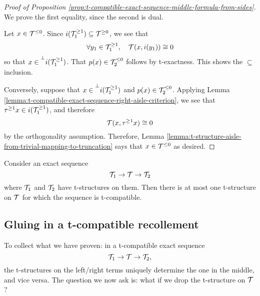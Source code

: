 \begin{proof}[Proof of Proposition \ref{prop:t-compatible-exact-sequence-middle-formula-from-sides}]
We prove the first equality, since the second is dual.

Let \(x\in\mathcal{T}^{\leq 0}\). Since \(i(\mathcal{T}_1^{\geq 1})\subseteq\mathcal{T}^{\geq 0}\), we see that
\[ \forall y_1\in\mathcal{T}_1^{\geq 1},\quad \mathcal{T}(x,i(y_1)) \cong 0 \]
so that \(x\in\prescript{\perp}{}{i(\ensuremath{\mathcal{T}}_1^{\geq 1})}\). That \(p(x)\in\mathcal{T}_2^{\leq 0}\) follows by t-exactness. This shows the \(\subseteq\) inclusion.

Conversely, suppose that \(x\in\prescript{\perp}{}{i(\ensuremath{\mathcal{T}}_1^{\geq 1})}\) and \(p(x)\in\mathcal{T}_2^{\leq 0}\). Applying Lemma \ref{lemma:t-compatible-exact-sequence-right-aisle-criterion}, we see that
\(\tau^{\geq 1}x \in i(\mathcal{T}_1^{\geq 1})\), and therefore
\[ \mathcal{T}(x,\tau^{\geq 1}x) \cong 0 \]
by the orthogonality assumption. Therefore, Lemma \ref{lemma:t-structure-aisle-from-trivial-mapping-to-truncation} says that \(x\in\mathcal{T}^{\leq 0}\) as desired.
\end{proof}
\begin{corollary}
	Consider an exact sequence
	\[ \mathcal{T}_1 \to \mathcal{T} \to \mathcal{T}_2 \]
	where \(\mathcal{T}_1\) and \(\mathcal{T}_2\) have t-structures on them. Then there is at most one t-structure on \(\mathcal{T}\) for which the sequence is t-compatible.
\end{corollary}

\subsection{Gluing in a t-compatible recollement}
To collect what we have proven: in a t-compatible exact sequence
\[ \mathcal{T}_1 \to \mathcal{T} \to \mathcal{T}_2, \]
the t-structures on the left/right terms uniquely determine the one in the middle, and vice versa. The question we now ask is: what if we drop the t-structure on \(\mathcal{T}\)?

